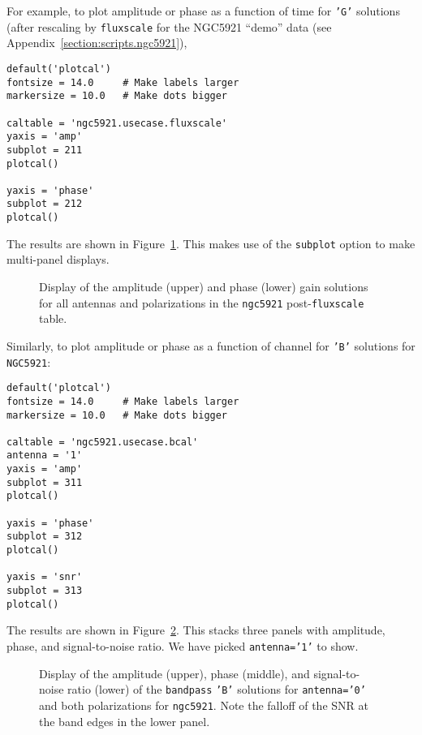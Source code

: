 {For example, to plot amplitude or phase as a function of time for 
{\tt 'G'} solutions (after rescaling by {\tt fluxscale} for the NGC5921
``demo'' data (see Appendix~\ref{section:scripts.ngc5921}),
\small
\begin{verbatim}
default('plotcal')
fontsize = 14.0     # Make labels larger
markersize = 10.0   # Make dots bigger

caltable = 'ngc5921.usecase.fluxscale'
yaxis = 'amp'
subplot = 211
plotcal()

yaxis = 'phase'
subplot = 212
plotcal()
\end{verbatim}
\normalsize
The results are shown in Figure~\ref{fig:plotcal_G_5921}.  This makes 
use of the {\tt subplot} option to make multi-panel displays.

\begin{figure}[h!]
\begin{center}
\caption{\label{fig:plotcal_G_5921} Display of the amplitude (upper)
and phase (lower) gain solutions for all antennas and polarizations 
in the {\tt ngc5921} post-{\tt fluxscale} table.} 
\hrulefill
\end{center}
\end{figure}


Similarly, to plot amplitude or phase as a function of channel for
{\tt 'B'} solutions for {\tt NGC5921}:
\small
\begin{verbatim}
default('plotcal')
fontsize = 14.0     # Make labels larger
markersize = 10.0   # Make dots bigger

caltable = 'ngc5921.usecase.bcal'
antenna = '1'
yaxis = 'amp'
subplot = 311
plotcal()

yaxis = 'phase'
subplot = 312
plotcal()

yaxis = 'snr'
subplot = 313
plotcal()
\end{verbatim}
\normalsize
The results are shown in Figure~\ref{fig:plotcal_B_5921}.  This stacks
three panels with amplitude, phase, and signal-to-noise ratio.  We
have picked {\tt antenna='1'} to show.

\begin{figure}[h!]
\begin{center}
\caption{\label{fig:plotcal_B_5921} Display of the amplitude (upper),
phase (middle), and signal-to-noise ratio (lower) of the
{\tt bandpass} {\tt 'B'} solutions for {\tt antenna='0'} and both
polarizations for {\tt ngc5921}.  Note the falloff of the SNR at
the band edges in the lower panel.} 
\hrulefill
\end{center}
\end{figure}

}
